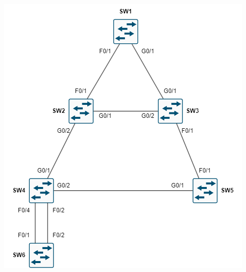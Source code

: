 \documentclass[a4paper]{book}
\begin{document}
\begin{minipage}{0.4\textwidth}
	\centering
	\includegraphics[width=\linewidth]{img/stp03.png}
\end{minipage}%
\hfill
\end{document}
